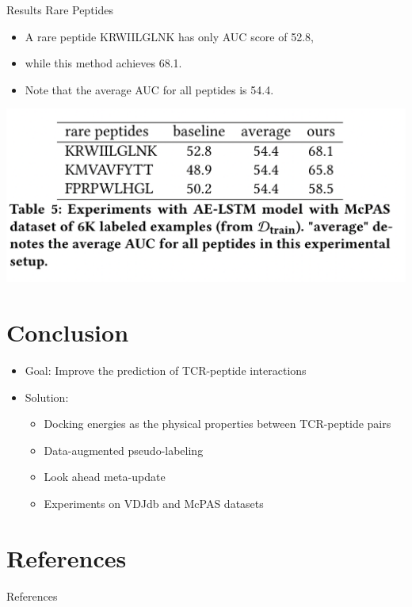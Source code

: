 \documentclass[aspectratio=1610,xcolor={dvipsnames},hyperref={colorlinks,unicode,linkcolor=violet,anchorcolor=blueviolet,citecolor=YellowOrange,filecolor=black,urlcolor=Aquamarine}]{beamer}
\begin{document}
\begin{frame}[label={sec:orgaafa611}]{Results Rare Peptides}
\begin{itemize}
\item A rare peptide KRWIILGLNK has only AUC score of 52.8,
\item while this method achieves 68.1.
\item Note that the average AUC for all peptides is 54.4.
\end{itemize}

\begin{center}
\includegraphics[width=.9\linewidth]{./p8.png}
\end{center}
\end{frame}

\section{Conclusion}
\label{sec:orgb6fd2fc}

\begin{itemize}
\item Goal: Improve the prediction of TCR-peptide interactions
\item Solution:
\begin{itemize}
\item Docking energies as the physical properties between TCR-peptide pairs
\item Data-augmented pseudo-labeling
\item Look ahead meta-update
\item Experiments on VDJdb and McPAS datasets
\end{itemize}
\end{itemize}

\section{References}
\label{sec:org521c989}

\begin{frame}[allowframebreaks]{References}
\printbibliography[heading=none]
\end{frame}
\end{document}

